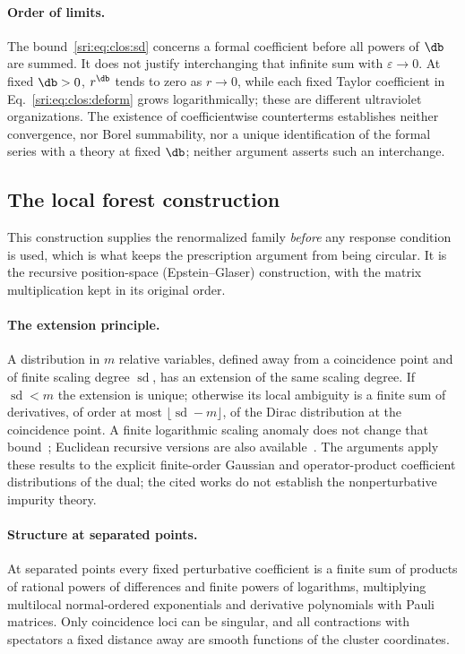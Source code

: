 \paragraph{Order of limits.} The bound~\eqref{sri:eq:clos:sd} concerns a formal coefficient before all powers of $\db$ are
summed. It does not justify interchanging that infinite sum with $\varepsilon\to0$. At fixed $\db>0$, $r^{\db}$ tends to
zero as $r\to0$, while each fixed Taylor coefficient in Eq.~\eqref{sri:eq:clos:deform} grows logarithmically; these are
different ultraviolet organizations. The existence of coefficientwise counterterms establishes neither convergence,
nor Borel summability, nor a unique identification of the formal series with a theory at fixed $\db$; neither argument
asserts such an interchange.

\subsection{The local forest construction}\label{sri:app:clos:forest}
This construction supplies the renormalized family \emph{before} any response condition is used, which is what keeps
the prescription argument from being circular. It is the recursive position-space (Epstein--Glaser) construction,
with the matrix multiplication kept in its original order.

\paragraph{The extension principle.} A distribution in $m$ relative variables, defined away from a coincidence point and
of finite scaling degree $\operatorname{sd}$, has an extension of the same scaling degree. If $\operatorname{sd}<m$ the
extension is unique; otherwise its local ambiguity is a finite sum of derivatives, of order at most
$\lfloor\operatorname{sd}-m\rfloor$, of the Dirac distribution at the coincidence point. A finite logarithmic scaling
anomaly does not change that bound~\cite{sri:Brunetti:2000,sri:Dutsch:2014}; Euclidean recursive versions are also
available~\cite{sri:Keller:2009}. The arguments apply these results to the explicit finite-order Gaussian and
operator-product coefficient distributions of the dual; the cited works do not establish the nonperturbative impurity
theory.

\paragraph{Structure at separated points.} At separated points every fixed perturbative coefficient is a finite sum of
products of rational powers of differences and finite powers of logarithms, multiplying multilocal normal-ordered
exponentials and derivative polynomials with Pauli matrices. Only coincidence loci can be singular, and all
contractions with spectators a fixed distance away are smooth functions of the cluster coordinates.

